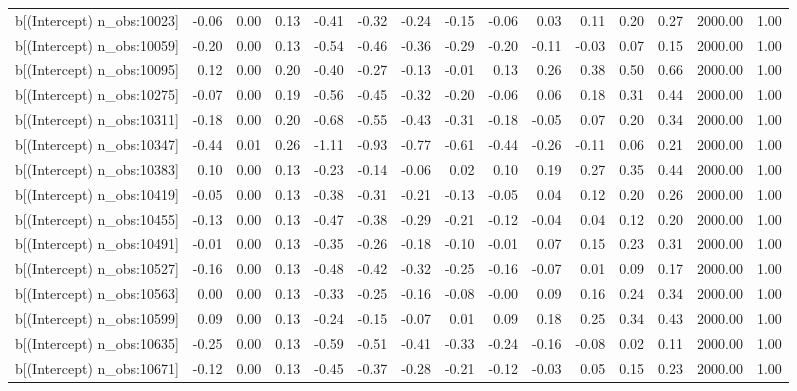 \begin{table}[ht]
\begin{tabular}{rrrrrrrrrrrrrrr}
  b[(Intercept) n\_obs:10023] & -0.06 & 0.00 & 0.13 & -0.41 & -0.32 & -0.24 & -0.15 & -0.06 & 0.03 & 0.11 & 0.20 & 0.27 & 2000.00 & 1.00 \\ 
  b[(Intercept) n\_obs:10059] & -0.20 & 0.00 & 0.13 & -0.54 & -0.46 & -0.36 & -0.29 & -0.20 & -0.11 & -0.03 & 0.07 & 0.15 & 2000.00 & 1.00 \\ 
  b[(Intercept) n\_obs:10095] & 0.12 & 0.00 & 0.20 & -0.40 & -0.27 & -0.13 & -0.01 & 0.13 & 0.26 & 0.38 & 0.50 & 0.66 & 2000.00 & 1.00 \\ 
  b[(Intercept) n\_obs:10275] & -0.07 & 0.00 & 0.19 & -0.56 & -0.45 & -0.32 & -0.20 & -0.06 & 0.06 & 0.18 & 0.31 & 0.44 & 2000.00 & 1.00 \\ 
  b[(Intercept) n\_obs:10311] & -0.18 & 0.00 & 0.20 & -0.68 & -0.55 & -0.43 & -0.31 & -0.18 & -0.05 & 0.07 & 0.20 & 0.34 & 2000.00 & 1.00 \\ 
  b[(Intercept) n\_obs:10347] & -0.44 & 0.01 & 0.26 & -1.11 & -0.93 & -0.77 & -0.61 & -0.44 & -0.26 & -0.11 & 0.06 & 0.21 & 2000.00 & 1.00 \\ 
  b[(Intercept) n\_obs:10383] & 0.10 & 0.00 & 0.13 & -0.23 & -0.14 & -0.06 & 0.02 & 0.10 & 0.19 & 0.27 & 0.35 & 0.44 & 2000.00 & 1.00 \\ 
  b[(Intercept) n\_obs:10419] & -0.05 & 0.00 & 0.13 & -0.38 & -0.31 & -0.21 & -0.13 & -0.05 & 0.04 & 0.12 & 0.20 & 0.26 & 2000.00 & 1.00 \\ 
  b[(Intercept) n\_obs:10455] & -0.13 & 0.00 & 0.13 & -0.47 & -0.38 & -0.29 & -0.21 & -0.12 & -0.04 & 0.04 & 0.12 & 0.20 & 2000.00 & 1.00 \\ 
  b[(Intercept) n\_obs:10491] & -0.01 & 0.00 & 0.13 & -0.35 & -0.26 & -0.18 & -0.10 & -0.01 & 0.07 & 0.15 & 0.23 & 0.31 & 2000.00 & 1.00 \\ 
  b[(Intercept) n\_obs:10527] & -0.16 & 0.00 & 0.13 & -0.48 & -0.42 & -0.32 & -0.25 & -0.16 & -0.07 & 0.01 & 0.09 & 0.17 & 2000.00 & 1.00 \\ 
  b[(Intercept) n\_obs:10563] & 0.00 & 0.00 & 0.13 & -0.33 & -0.25 & -0.16 & -0.08 & -0.00 & 0.09 & 0.16 & 0.24 & 0.34 & 2000.00 & 1.00 \\ 
  b[(Intercept) n\_obs:10599] & 0.09 & 0.00 & 0.13 & -0.24 & -0.15 & -0.07 & 0.01 & 0.09 & 0.18 & 0.25 & 0.34 & 0.43 & 2000.00 & 1.00 \\ 
  b[(Intercept) n\_obs:10635] & -0.25 & 0.00 & 0.13 & -0.59 & -0.51 & -0.41 & -0.33 & -0.24 & -0.16 & -0.08 & 0.02 & 0.11 & 2000.00 & 1.00 \\ 
  b[(Intercept) n\_obs:10671] & -0.12 & 0.00 & 0.13 & -0.45 & -0.37 & -0.28 & -0.21 & -0.12 & -0.03 & 0.05 & 0.15 & 0.23 & 2000.00 & 1.00 \\ 

\end{tabular}
\end{table}
